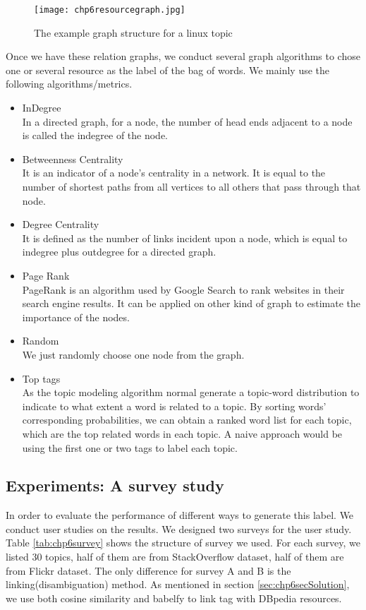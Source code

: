 \begin{figure}[htp]
\centering
\texttt{[image: chp6resourcegraph.jpg]}  
\caption{The example graph structure for a linux topic}
\label{fig:chp6resourcegraph} 
\end{figure}

Once we have these relation graphs, we conduct several graph algorithms to chose one or several resource as the label of the bag of words. We mainly use the following algorithms/metrics.
\begin{itemize}
    \item {InDegree} \\
    In a directed graph, for a node, the number of head ends adjacent to a node is called the indegree of the node. 
    \item {Betweenness Centrality } \\
    It is an indicator of a node's centrality in a network. It is equal to the number of shortest paths from all vertices to all others that pass through that node.
    \item {Degree Centrality} \\
    It is defined as the number of links incident upon a node, which is equal to indegree plus outdegree for a directed graph.
    \item {Page Rank\cite{chp6page1999pagerank}}\\
    PageRank is an algorithm used by Google Search to rank websites in their search engine results. It can be applied on other kind of graph to estimate the importance of the nodes.
    \item {Random} \\
    We just randomly choose one node from the graph.
    \item {Top tags} \\
    As the topic modeling algorithm normal generate a topic-word distribution to indicate to what extent a word is related to a topic. By sorting words' corresponding probabilities, we can obtain a ranked word list for each topic, which are the top related words in each topic. A naive approach would be using the first one or two tags to label each topic. 

\end{itemize}

\subsection{Experiments: A survey study}
In order to evaluate the performance of different ways to generate this label. We conduct user studies on the results. We designed two surveys for the user study. Table \ref{tab:chp6survey} shows the structure of survey we used. For each survey, we listed 30 topics, half of them are from StackOverflow dataset, half of them are from Flickr dataset. The only difference for survey A and B is the linking(disambiguation) method. As mentioned in section \ref{sec:chp6secSolution}, we use both cosine similarity and babelfy to link tag with DBpedia resources. 



